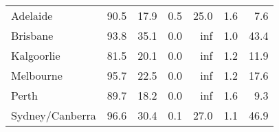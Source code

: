 \begin{tabular}{lrrrrrr}
\toprule
\midrule
Adelaide & 90.5 & 17.9 & 0.5 & 25.0 & 1.6 & 7.6 \\
Brisbane & 93.8 & 35.1 & 0.0 & inf & 1.0 & 43.4 \\
Kalgoorlie & 81.5 & 20.1 & 0.0 & inf & 1.2 & 11.9 \\
Melbourne & 95.7 & 22.5 & 0.0 & inf & 1.2 & 17.6 \\
Perth & 89.7 & 18.2 & 0.0 & inf & 1.6 & 9.3 \\
Sydney/Canberra & 96.6 & 30.4 & 0.1 & 27.0 & 1.1 & 46.9 \\
\bottomrule
\end{tabular}
